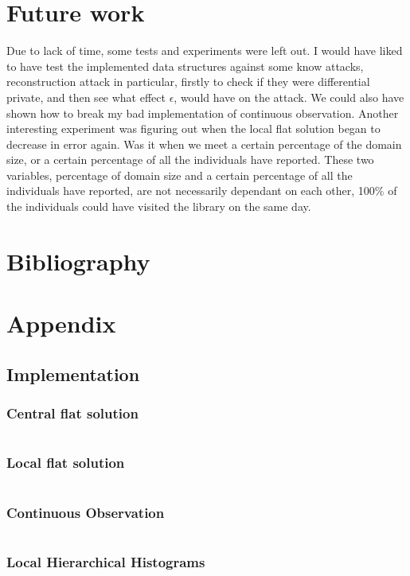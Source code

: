 \documentclass[11pt]{article}
\theoremstyle{definition}
\begin{document}
\section{Future work}
Due to lack of time, some tests and experiments were left out. I would have liked to have test the implemented data structures against some know attacks, reconstruction attack in particular, firstly to check if they were differential private, and then see what effect $\epsilon$, would have on the attack. We could also have shown how to break my bad implementation of continuous observation. Another interesting experiment was figuring out when the local flat solution began to decrease in error again. Was it when we meet a certain percentage of the domain size, or a certain percentage of all the individuals have reported. These two variables, percentage of domain size and a certain percentage of all the individuals have reported, are not necessarily dependant on each other, 100\% of the individuals could have visited the library on the same day. 


\newpage \section{Bibliography}
\printbibliography[]
\newpage \section{Appendix}
\subsection{Implementation}\label{app:imp}
\subsubsection{Central flat solution}
\inputminted[fontsize=\footnotesize,linenos]{python}{py_files/cen_flat.py}
\subsubsection{Local flat solution}
\inputminted[fontsize=\footnotesize,linenos]{python}{py_files/flat_olh.py}
\subsubsection{Continuous Observation}
\inputminted[fontsize=\footnotesize,linenos]{python}{py_files/con_obs.py}
\subsubsection{Local Hierarchical Histograms}
\inputminted[fontsize=\footnotesize,linenos]{python}{py_files/local_hh_object.py}
\end{document}
